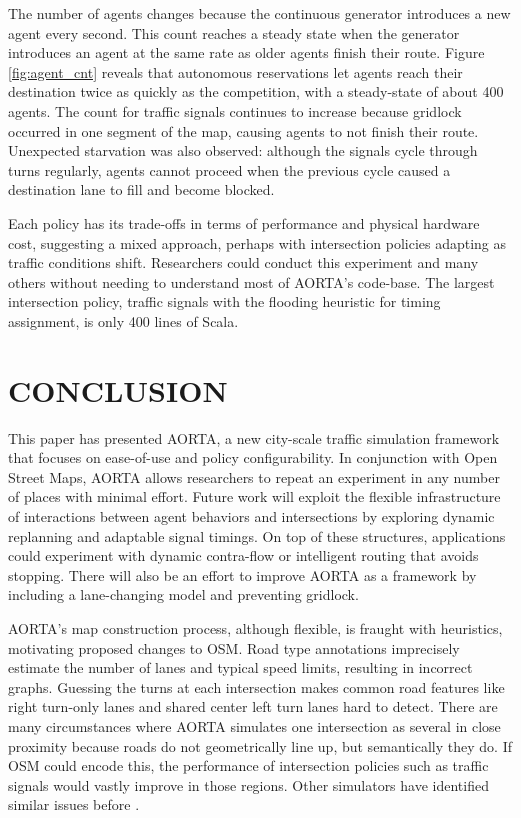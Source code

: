 \documentclass[letterpaper, 10 pt, conference]{ieeeconf}  %
\begin{document}
The number of agents changes because the continuous generator introduces a new
agent every second. This count reaches a steady state when the generator
introduces an agent at the same rate as older agents finish their route. Figure
\ref{fig:agent_cnt} reveals that autonomous reservations let agents reach their
destination twice as quickly as the competition, with a steady-state of about
400 agents. The count for traffic signals continues to increase because gridlock
occurred in one segment of the map, causing agents to not finish their route.
Unexpected starvation was also observed: although the signals cycle through
turns regularly, agents cannot proceed when the previous cycle caused a
destination lane to fill and become blocked.

Each policy has its trade-offs in terms of performance and physical hardware
cost, suggesting a mixed approach, perhaps with intersection policies adapting
as traffic conditions shift. Researchers could conduct this experiment and many
others without needing to understand most of AORTA's code-base. The largest
intersection policy, traffic signals with the flooding heuristic for timing
assignment, is only 400 lines of Scala.


\section{CONCLUSION}
\label{sec:conclusion}

This paper has presented AORTA, a new city-scale traffic simulation framework
that focuses on ease-of-use and policy configurability. In conjunction with Open
Street Maps, AORTA allows researchers to repeat an experiment in any number of
places with minimal effort. Future work will exploit the flexible infrastructure
of interactions between agent behaviors and intersections by exploring dynamic
replanning and adaptable signal timings. On top of these structures,
applications could experiment with dynamic contra-flow \cite{ITSC11-hausknecht}
or intelligent routing that avoids stopping. There will also be an effort to
improve AORTA as a framework by including a lane-changing model and preventing
gridlock. 

AORTA's map construction process, although flexible, is fraught with heuristics,
motivating proposed changes to OSM. Road type annotations imprecisely estimate
the number of lanes and typical speed limits, resulting in incorrect graphs.
Guessing the turns at each intersection makes common road features like right
turn-only lanes and shared center left turn lanes hard to detect. There are many
circumstances where AORTA simulates one intersection as several in close
proximity because roads do not geometrically line up, but semantically they do.
If OSM could encode this, the performance of intersection policies such as
traffic signals would vastly improve in those regions. Other simulators have
identified similar issues before \cite{Krajzewicz_Hertkorn_Ringel_Wagner_2005}.
\end{document}
